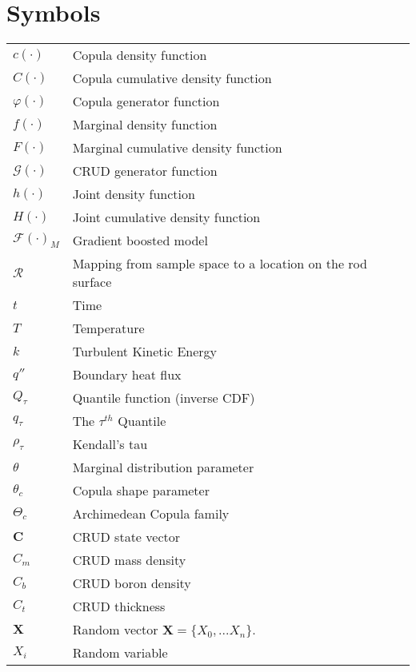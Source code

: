 \pagebreak

\section*{Symbols}
\begin{tabular}{l l}
$c(\cdot)$ & Copula density function \\
$C(\cdot)$ & Copula cumulative density function \\
$\varphi(\cdot)$ & Copula generator function \\
$f(\cdot)$ & Marginal density function \\
$F(\cdot)$ & Marginal cumulative density function \\
$\mathcal G(\cdot)$ & CRUD generator function \\
$h(\cdot)$ & Joint density function \\
$H(\cdot)$ & Joint cumulative density function \\
$\mathcal F(\cdot)_M$ & Gradient boosted model \\
$\mathcal R$ & Mapping from sample space to a location on the rod surface \\
$t$ & Time \\
$T$ & Temperature \\
$k$ & Turbulent Kinetic Energy \\
$q''$ & Boundary heat flux \\
$Q_{\tau}$ & Quantile function (inverse CDF) \\
$q_{\tau}$ & The $\tau^{th}$ Quantile \\
$\rho_{\tau}$ & Kendall's tau \\
$\theta$ & Marginal distribution parameter \\
$\theta_c$ & Copula shape parameter \\
$\Theta_c$ & Archimedean Copula family \\
$\mathbf C$ & CRUD state vector \\
$C_m$ & CRUD mass density \\
$C_b$ & CRUD boron density \\
$C_t$ & CRUD thickness \\
$\mathbf X$ & Random vector $\mathbf X = \{X_0, ... X_n\}$. \\
$X_i$ & Random variable \\
\end{tabular}


\listoftables

\listoffigures

\pagebreak
